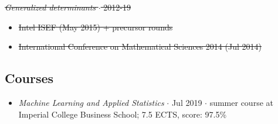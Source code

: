 \documentclass{article}
\newcommand{\disown}[1]{\sout{#1}}
\newcommand{\archive}{\color{lightgray}}
\begin{document}
\begin{itemize}
{    \item \disown{\emph{Generalized determinants} $\cdot$ 2012-19}
    \begin{itemize}
        \item \disown{Intel ISEF (May 2015) + precursor rounds}
        \item \disown{International Conference on Mathematical Sciences 2014 (Jul 2014)}

    \end{itemize}

}

\end{itemize}

{\archive

\subsection*{Courses}

\begin{itemize}
    \item \emph{Machine Learning and Applied Statistics} $\cdot$ Jul 2019 $\cdot$ summer course at Imperial College Business School; 7.5 ECTS, score: 97.5\%
\end{itemize}

}
\end{document}
